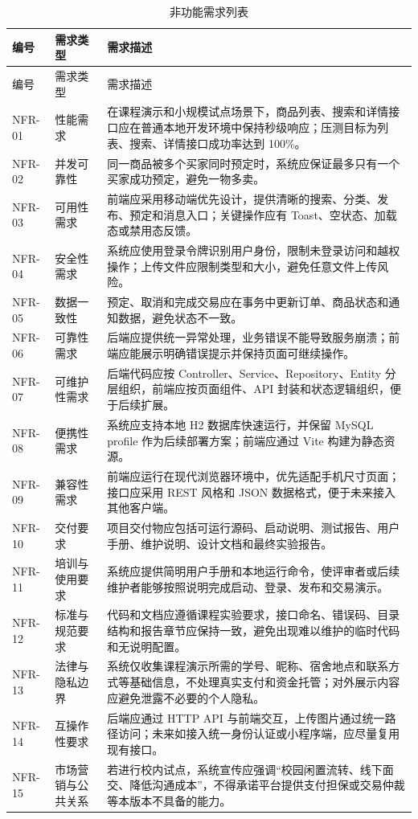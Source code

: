 ﻿\documentclass[UTF8,a4paper,12pt]{ctexart}
\begin{document}
\begin{longtable}{p{2.2cm}p{3.6cm}p{7.8cm}}
  \caption{非功能需求列表}\label{tab:nonfunctional-requirements} \\
  \toprule
  编号 & 需求类型 & 需求描述 \\
  \midrule
  \endfirsthead
  \toprule
  编号 & 需求类型 & 需求描述 \\
  \midrule
  \endhead
  NFR-01 & 性能需求 & 在课程演示和小规模试点场景下，商品列表、搜索和详情接口应在普通本地开发环境中保持秒级响应；压测目标为列表、搜索、详情接口成功率达到 100\%。 \\
  NFR-02 & 并发可靠性 & 同一商品被多个买家同时预定时，系统应保证最多只有一个买家成功预定，避免一物多卖。 \\
  NFR-03 & 可用性需求 & 前端应采用移动端优先设计，提供清晰的搜索、分类、发布、预定和消息入口；关键操作应有 Toast、空状态、加载态或禁用态反馈。 \\
  NFR-04 & 安全性需求 & 系统应使用登录令牌识别用户身份，限制未登录访问和越权操作；上传文件应限制类型和大小，避免任意文件上传风险。 \\
  NFR-05 & 数据一致性 & 预定、取消和完成交易应在事务中更新订单、商品状态和通知数据，避免状态不一致。 \\
  NFR-06 & 可靠性需求 & 后端应提供统一异常处理，业务错误不能导致服务崩溃；前端应能展示明确错误提示并保持页面可继续操作。 \\
  NFR-07 & 可维护性需求 & 后端代码应按 Controller、Service、Repository、Entity 分层组织，前端应按页面组件、API 封装和状态逻辑组织，便于后续扩展。 \\
  NFR-08 & 便携性需求 & 系统应支持本地 H2 数据库快速运行，并保留 MySQL profile 作为后续部署方案；前端应通过 Vite 构建为静态资源。 \\
  NFR-09 & 兼容性需求 & 前端应运行在现代浏览器环境中，优先适配手机尺寸页面；接口应采用 REST 风格和 JSON 数据格式，便于未来接入其他客户端。 \\
  NFR-10 & 交付要求 & 项目交付物应包括可运行源码、启动说明、测试报告、用户手册、维护说明、设计文档和最终实验报告。 \\
  NFR-11 & 培训与使用要求 & 系统应提供简明用户手册和本地运行命令，使评审者或后续维护者能够按照说明完成启动、登录、发布和交易演示。 \\
  NFR-12 & 标准与规范要求 & 代码和文档应遵循课程实验要求，接口命名、错误码、目录结构和报告章节应保持一致，避免出现难以维护的临时代码和无说明配置。 \\
  NFR-13 & 法律与隐私边界 & 系统仅收集课程演示所需的学号、昵称、宿舍地点和联系方式等基础信息，不处理真实支付和资金托管；对外展示内容应避免泄露不必要的个人隐私。 \\
  NFR-14 & 互操作性要求 & 后端应通过 HTTP API 与前端交互，上传图片通过统一路径访问；未来如接入统一身份认证或小程序端，应尽量复用现有接口。 \\
  NFR-15 & 市场营销与公共关系 & 若进行校内试点，系统宣传应强调“校园闲置流转、线下面交、降低沟通成本”，不得承诺平台提供支付担保或交易仲裁等本版本不具备的能力。 \\
  \bottomrule
\end{longtable}
\end{document}
